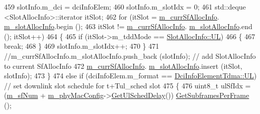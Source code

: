 \begin{DoxyCode}
459                                 slotInfo.m\_dci = dciInfoElem;
460                                 slotInfo.m\_slotIdx = 0;
461                                 std::deque <SlotAllocInfo>::iterator itSlot;
462                                 \textcolor{keywordflow}{for} (itSlot = \hyperlink{classns3_1_1MmWaveUePhy_ac557b99a2b425df99cb8d827f939df90}{m\_currSfAllocInfo}.
      \hyperlink{structns3_1_1SfAllocInfo_a6a87109ff89bf270a74ff95a5bbf9231}{m\_slotAllocInfo}.begin ();
463                                                 itSlot != \hyperlink{classns3_1_1MmWaveUePhy_ac557b99a2b425df99cb8d827f939df90}{m\_currSfAllocInfo}.
      \hyperlink{structns3_1_1SfAllocInfo_a6a87109ff89bf270a74ff95a5bbf9231}{m\_slotAllocInfo}.end (); itSlot++)
464                                 \{
465                                         \textcolor{keywordflow}{if} (itSlot->m\_tddMode == 
      \hyperlink{structns3_1_1SlotAllocInfo_a6cad60db1d39034f1851e2cea625fe5da916b5be54594ead6ed677c570311cad2}{SlotAllocInfo::UL})
466                                         \{
467                                                 \textcolor{keywordflow}{break};
468                                         \}
469                                         slotInfo.m\_slotIdx++;
470                                 \}
471                                 \textcolor{comment}{//m\_currSfAllocInfo.m\_slotAllocInfo.push\_back (slotInfo);  // add
       SlotAllocInfo to current SfAllocInfo}
472                                 \hyperlink{classns3_1_1MmWaveUePhy_ac557b99a2b425df99cb8d827f939df90}{m\_currSfAllocInfo}.
      \hyperlink{structns3_1_1SfAllocInfo_a6a87109ff89bf270a74ff95a5bbf9231}{m\_slotAllocInfo}.insert (itSlot, slotInfo);
473                         \}
474                         \textcolor{keywordflow}{else} \textcolor{keywordflow}{if} (dciInfoElem.m\_format == \hyperlink{structns3_1_1DciInfoElementTdma_af998ccd3b1e03836c113d353facc76f4a8611bf12ef88d043baf0e591bc63b314}{DciInfoElementTdma::UL}) \textcolor{comment}{//
       set downlink slot schedule for t+Tul\_sched slot}
475                         \{
476                                 uint8\_t ulSfIdx = (\hyperlink{classns3_1_1MmWavePhy_af3d76eb9f3e5e1ff669852d05986c1a3}{m\_sfNum} + 
      \hyperlink{classns3_1_1MmWavePhy_a869abf36bbdbb94eed77ba6e4846f6e4}{m\_phyMacConfig}->\hyperlink{classns3_1_1MmWavePhyMacCommon_afd70935ec71838fefe6a8e18198f19cb}{GetUlSchedDelay}()) %
      \hyperlink{classns3_1_1MmWavePhyMacCommon_a3709cf52f6813eb8ad1af16d95082dc1}{GetSubframesPerFrame} ();

\end{DoxyCode}
